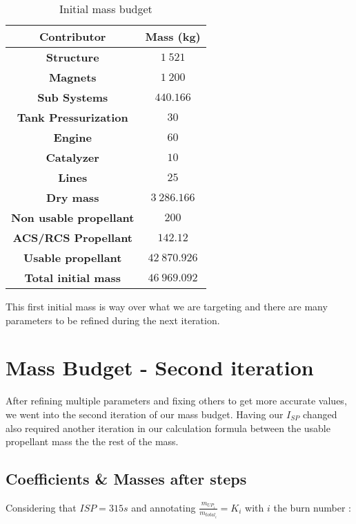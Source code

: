	\begin{table}[H]
\centering
	
\begin{tabular}[H]{|c|c|}
	\hline
	\cellcolor{gray!50}\textbf{Contributor} & \cellcolor{green!20}\textbf{Mass} (kg)\\
	\hline
	\textbf{Structure} & $1\ 521$\\
	\hline
	\textbf{Magnets} & $1\ 200$\\
	\hline
	\textbf{Sub Systems} & $440.166$\\
	\hline
	\textbf{Tank Pressurization} & $30$\\
	\hline
	\textbf{Engine} & $60$\\
	\hline
	\textbf{Catalyzer} & $10$\\
	\hline
	\textbf{Lines} & $25$\\
	\hline
	\cellcolor{gray!50}\textbf{Dry mass} & \cellcolor{green!20} $3\ 286.166$\\
	\hline
	\textbf{Non usable propellant} & $200$\\
	\hline
	\textbf{ACS/RCS Propellant} & $142. 12$\\
	\hline
	\textbf{Usable propellant} & $42\ 870.926$\\
	\cellcolor{red!50}\textbf{Total initial mass} & \cellcolor{red!50}$46\ 969.092$\\
	\hline 
\end{tabular}
\caption{Initial mass budget}
\end{table}

This first initial mass is way over what we are targeting and there are many parameters to be refined during the next iteration.
\newpage
\section{Mass Budget - Second iteration}
\qquad After refining multiple parameters and fixing others to get more accurate values, we went into the second iteration of our mass budget. Having our $I_{SP}$ changed also required another iteration in our calculation formula between the usable propellant mass the the rest of the mass.

\subsection{Coefficients \& Masses after steps}

Considering that \(ISP = 315s\) and annotating
\(\frac{m_{UP_i}}{m_{total_i}} = K_i\) with \(i\) the burn number :

